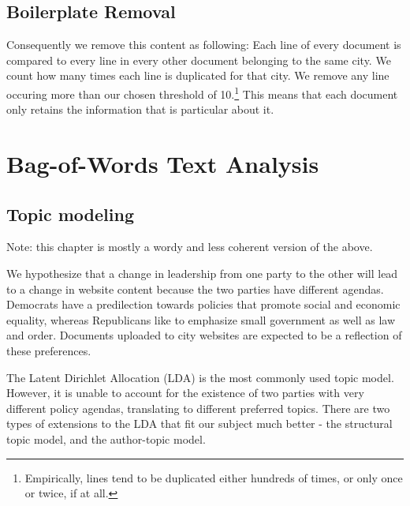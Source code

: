 \documentclass[11pt]{article}
\begin{document}
\subsection{Boilerplate Removal}

Consequently we remove this content as following: Each line of every document is compared to every line in every other document belonging to the same city. We count how many times each line is duplicated for that city. We remove any line occuring more than our chosen threshold of 10.\footnote{Empirically, lines tend to be duplicated either hundreds of times, or only once or twice, if at all.} This means that each document only retains the information that is particular about it.




\section{Bag-of-Words Text Analysis}


\subsection{Topic modeling}
Note: this chapter is mostly a wordy and less coherent version of the above.

We hypothesize that a change in leadership from one party to the other will lead to a change in website content because the two parties have different agendas. Democrats have a predilection towards policies that promote social and economic equality, whereas Republicans like to emphasize small government as well as law and order. Documents uploaded to city websites are expected to be a reflection of these preferences.

The Latent Dirichlet Allocation (LDA) \citep{Blei2003} is the most commonly used topic model. However, it is unable to account for the existence of two parties with very different policy agendas, translating to different preferred topics. There are two types of extensions to the LDA that fit our subject much better - the structural topic model, and the author-topic model.
\end{document}
